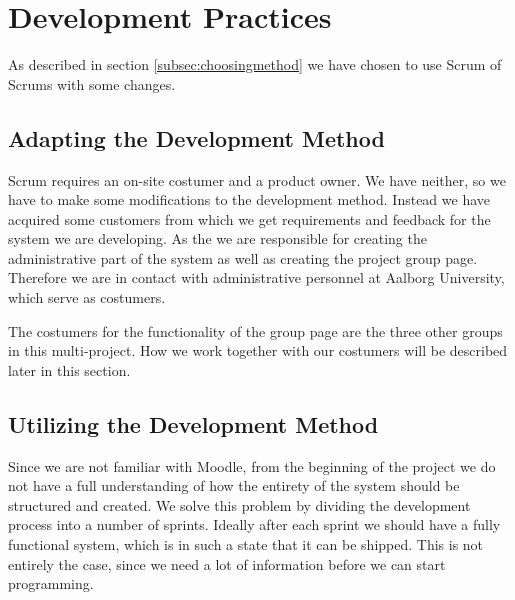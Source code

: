 \chapter{Development Practices} %
As described in section \ref{subsec:choosingmethod} we have chosen to use Scrum of Scrums with some changes.


\section{Adapting the Development Method}



Scrum requires an on-site costumer and a product owner.
We have neither, so we have to make some modifications to the development method.
Instead we have acquired some customers from which we get requirements and feedback for the system we are developing.
As the \groupname{} we are responsible for creating the administrative part of the system as well as creating the project group page.
Therefore we are in contact with administrative personnel at Aalborg University, which serve as costumers.

The costumers for the functionality of the group page are the three other groups in this multi-project.
How we work together with our costumers will be described later in this section.

\section{Utilizing the Development Method} %
Since we are not familiar with Moodle, from the beginning of the project we do not have a full understanding of how the entirety of the system should be structured and created.
We solve this problem by dividing the development process into a number of sprints.
Ideally after each sprint we should have a fully functional system, which is in such a state that it can be shipped.
This is not entirely the case, since we need a lot of information before we can start programming.

